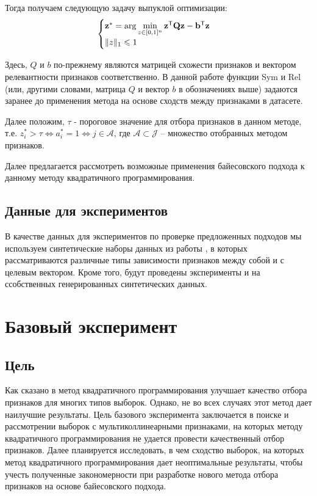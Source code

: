 \documentclass[12pt, twoside]{article}
\newcommand{\bz}{\mathbf{z}}
\newcommand{\bb}{\mathbf{b}}
\newcommand{\bJ}{\mathcal{J}}
\newcommand{\bQ}{\mathbf{Q}}
\newcommand{\getT}{^{\mathsf{T}}}
\begin{document}
Тогда получаем следующую задачу выпуклой оптимизации:
\begin{equation*}
\begin{cases}
   $$ \bz^* = \arg \min_{z \in [0, 1]^n}  \bz \getT \bQ \bz - \bb \getT \bz$$  \\
   $$\|z\|_1 \le 1$$
 \end{cases}
 \end{equation*}

Здесь, $Q$ и $b$ по-прежнему являются матрицей схожести признаков и вектором релевантности признаков соответственно. В данной работе функции Sym и Rel (или, другими словами, матрица $Q$ и вектор $b$ в обозначениях выше) задаются заранее до применения метода на основе сходств между признаками в датасете.

Далее положим, $\tau$ - пороговое значение для отбора признаков в данном методе, т.е. $z_i^* > \tau \Leftrightarrow a_i^* = 1 \Leftrightarrow j \in \mathcal{A}$, где $\mathcal{A} \subset \bJ$ -- множество отобранных методом признаков.

Далее предлагается рассмотреть возможные применения байесовского подхода к данному методу квадратичного программирования.


\subsection{Данные для экспериментов}

В качестве данных для экспериментов по проверке предложенных подходов мы используем синтетические наборы данных из работы \cite{Katrutsa15}, в которых рассматриваются различные типы зависимости признаков между собой и с целевым вектором. Кроме того, будут проведены эксперименты и на ссобственных генерированных синтетических данных.


\section{Базовый эксперимент}

\subsection{Цель}

Как сказано в \cite{KatrutsaS17} метод квадратичного программирования улучшает качество отбора признаков для многих типов выборок. Однако, не во всех случаях этот метод дает наилучшие результаты. Цель базового эксперимента заключается в поиске и рассмотрении выборок с мультиколлинеарными признаками, на которых методу квадратичного программирования не удается провести качественный отбор признаков. Далее планируется исследовать, в чем сходство выборок, на которых метод квадратичного программирования дает неоптимальные результаты, чтобы учесть полученные закономерности при разработке нового метода отбора признаков на основе байесовского подхода.
\end{document}
